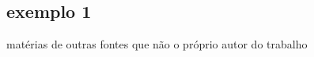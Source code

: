 \documentclass[
12pt,				%
openright,			%
twoside,			%
a4paper,			%
english,			%
french,				%
spanish,			%
brazil				%
]{abntex2}
\begin{document}
	\begin{anexosenv}
		
		\partanexos
		
		\chapter{exemplo 1}
		matérias de outras fontes que não o próprio autor do trabalho
		
	\end{anexosenv}
	
	\printindex
	
\end{document}
